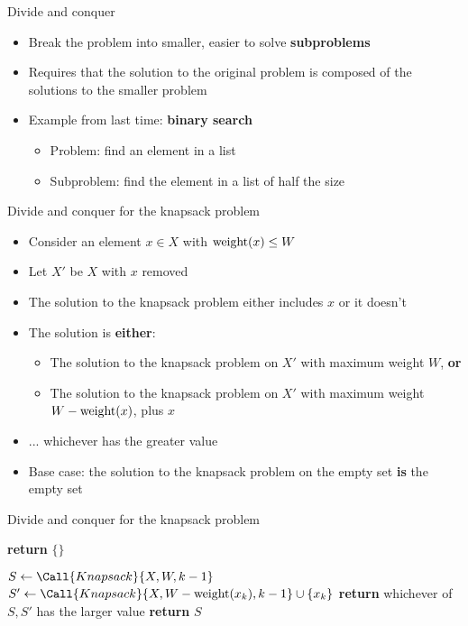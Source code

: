 \begin{frame}{Divide and conquer}
	\begin{itemize}
		\pause\item Break the problem into smaller, easier to solve \textbf{subproblems}
		\pause\item Requires that the solution to the original problem is composed of the solutions to the smaller problem
		\pause\item Example from last time: \textbf{binary search}
			\begin{itemize}
				\pause\item Problem: find an element in a list
				\pause\item Subproblem: find the element in a list of half the size
			\end{itemize}
	\end{itemize}
\end{frame}

\begin{frame}{Divide and conquer for the knapsack problem}
	\begin{itemize}
		\pause\item Consider an element $x \in X$ with $\operatorname{weight}(x) \leq W$
		\pause\item Let $X'$ be $X$ with $x$ removed
		\pause\item The solution to the knapsack problem either includes $x$ or it doesn't
		\pause\item The solution is \textbf{either}:
			\begin{itemize}
				\pause\item The solution to the knapsack problem on $X'$ with maximum weight $W$, \textbf{or}
				\pause\item The solution to the knapsack problem on $X'$ with maximum weight $W - \operatorname{weight}(x)$,
					plus $x$
			\end{itemize}
		\pause\item ... whichever has the greater value
		\pause\item Base case: the solution to the knapsack problem on the empty set \textbf{is} the empty set
	\end{itemize}
\end{frame}

\begin{frame}{Divide and conquer for the knapsack problem}
	\begin{algorithmic}
		\pause{}
			\pause{}
				\pause\State \textbf{return} $\{\}$
			\pause\EndIf
			
			\pause\State $S \gets \Call{Knapsack}{X, W, k-1}$
			\pause{}
				\pause\State $S' \gets \Call{Knapsack}{X, W - \weight(x_k), k-1} \cup \{x_k\}$
				\pause\State \textbf{return} whichever of $S,S'$ has the larger value
			\pause\Else
				\pause\State \textbf{return} $S$
			\pause\EndIf
		\pause\EndProcedure
	\end{algorithmic}
\end{frame}

